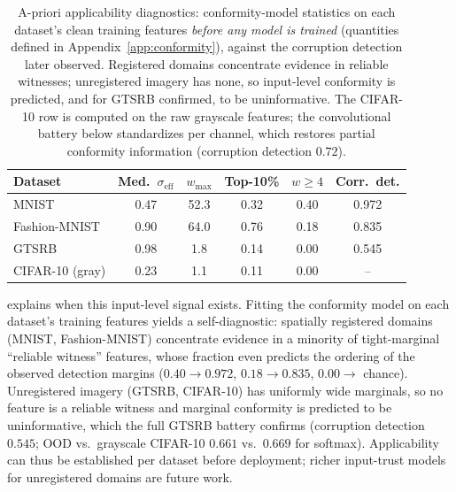 \begin{table}[ht]
\centering\footnotesize
\setlength{\tabcolsep}{4.5pt}
\begin{tabular}{lccccc}
\toprule
Dataset & Med.\ $\sigma_{\mathrm{eff}}$ & $w_{\max}$ & Top-10\% & $w{\geq}4$ & Corr.\ det. \\
\midrule
MNIST & 0.47 & 52.3 & 0.32 & 0.40 & 0.972 \\
Fashion-MNIST & 0.90 & 64.0 & 0.76 & 0.18 & 0.835 \\
GTSRB & 0.98 & 1.8 & 0.14 & 0.00 & 0.545 \\
CIFAR-10 (gray) & 0.23 & 1.1 & 0.11 & 0.00 & -- \\
\bottomrule
\end{tabular}
\caption{A-priori applicability diagnostics: conformity-model statistics on each dataset's clean training features \emph{before any model is trained} (quantities defined in Appendix~\ref{app:conformity}), against the corruption detection later observed. Registered domains concentrate evidence in reliable witnesses; unregistered imagery has none, so input-level conformity is predicted, and for GTSRB confirmed, to be uninformative. The CIFAR-10 row is computed on the raw grayscale features; the convolutional battery below standardizes per channel, which restores partial conformity information (corruption detection $0.72$).}
\label{tab:diagnostics}
\end{table}

 explains when this input-level signal exists. Fitting the conformity model on each dataset's training features yields a self-diagnostic: spatially registered domains (MNIST, Fashion-MNIST) concentrate evidence in a minority of tight-marginal ``reliable witness'' features, whose fraction even predicts the ordering of the observed detection margins ($0.40 \to 0.972$, $0.18 \to 0.835$, $0.00 \to$ chance). Unregistered imagery (GTSRB, CIFAR-10) has uniformly wide marginals, so no feature is a reliable witness and marginal conformity is predicted to be uninformative, which the full GTSRB battery confirms (corruption detection $0.545$; OOD vs.\ grayscale CIFAR-10 $0.661$ vs.\ $0.669$ for softmax). Applicability can thus be established per dataset before deployment; richer input-trust models for unregistered domains are future work.

